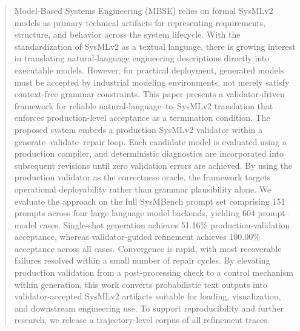 \documentclass[colorlinks,upint,subscriptcorrection,varvw,hyphenate,balance]{asmeconf} %
\begin{document}
\begin{abstract}

Model-Based Systems Engineering (MBSE) relies on formal SysMLv2 models as primary technical artifacts for representing requirements, structure, and behavior across the system lifecycle. With the standardization of SysMLv2 as a textual language, there is growing interest in translating natural-language engineering descriptions directly into executable models. However, for practical deployment, generated models must be accepted by industrial modeling environments, not merely satisfy context-free grammar constraints.
This paper presents a validator-driven framework for reliable natural-language–to–SysMLv2 translation that enforces production-level acceptance as a termination condition. The proposed system embeds a production SysMLv2 validator within a generate–validate–repair loop. Each candidate model is evaluated using a production compiler, and deterministic diagnostics are incorporated into subsequent revisions until zero validation errors are achieved. By using the production validator as the correctness oracle, the framework targets operational deployability rather than grammar plausibility alone.
We evaluate the approach on the full SysMBench prompt set comprising 151 prompts across four large language model backends, yielding 604 prompt–model cases. Single-shot generation achieves 51.16\% production-validation acceptance, whereas validator-guided refinement achieves 100.00\% acceptance across all cases. Convergence is rapid, with most recoverable failures resolved within a small number of repair cycles.
By elevating production validation from a post-processing check to a control mechanism within generation, this work converts probabilistic text outputs into validator-accepted SysMLv2 artifacts suitable for loading, visualization, and downstream engineering use. To support reproducibility and further research, we release a trajectory-level corpus of all refinement traces.




\end{abstract}
\end{document}
